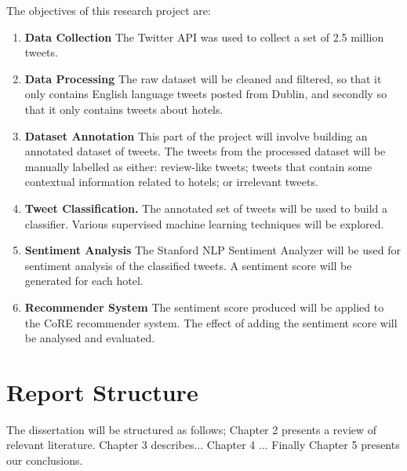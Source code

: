 The objectives of this research project are:
\begin{enumerate}
    \item \textbf{Data Collection}\newline
    The Twitter API was used to collect a set of 2.5 million tweets.
    \item \textbf{Data Processing}\newline
    The raw dataset will be cleaned and filtered, so that it only contains English language tweets posted from Dublin, and secondly so that it only contains tweets about hotels.
    \item \textbf{Dataset Annotation} \newline
    This part of the project will involve building an annotated dataset of tweets. The tweets from the processed dataset will be manually labelled as either: review-like tweets; tweets that contain some contextual information related to hotels; or irrelevant tweets.
    \item \textbf{Tweet Classification.}\newline
    The annotated set of tweets will be used to build a classifier. Various supervised machine learning techniques will be explored.
    \item \textbf{Sentiment Analysis}\newline
    The Stanford NLP Sentiment Analyzer \cite{stanfordSentiment2013} will be used for sentiment analysis of the classified tweets. A sentiment score will be generated for each hotel.
    \item \textbf{Recommender System}\newline
    The sentiment score produced will be applied to the CoRE recommender system.
    The effect of adding the sentiment score will be analysed and evaluated.
\end{enumerate}

\section{Report Structure}
The dissertation will be structured as follows; 
Chapter 2 presents a review of relevant literature. 
Chapter 3 describes... 
Chapter 4 ... 
Finally Chapter 5 presents our conclusions.